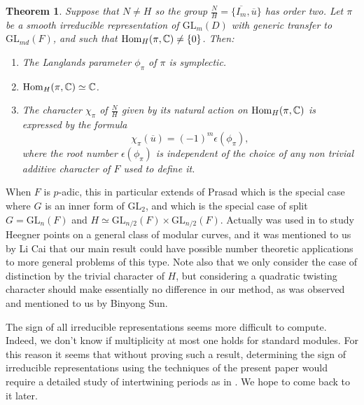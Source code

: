 \documentclass[11pt,letterpaper]{amsart}
\newcommand{\GL}{{\mathrm {GL}}} \newcommand{\PGL}{{\mathrm {PGL}}}
\newcommand{\Hom}{\mathrm{Hom}}
\def\e{\epsilon}
\theoremstyle{plain}
\newtheorem{thm}{Theorem}[section] \newtheorem{cor}[thm]{Corollary}
\numberwithin{equation}{section}
\begin{document}
\begin{thm}\label{thm main}
Suppose that $N\neq H$ so the group $\frac{N}{H}=\{\overline{I_m},\overline{u}\}$ has order two. Let $\pi$ be a smooth irreducible representation of $\GL_{m}(D)$ with generic transfer to $\GL_{md}(F)$, and such that $\Hom_H(\pi,\BC)\neq \{0\}$. Then:
\begin{enumerate}
\item The Langlands parameter $\phi_\pi$ of $\pi$ is symplectic.
\item $\Hom_H(\pi,\BC)\simeq \BC$.
\item The character $\chi_{\pi}$ of $\frac{N}{H}$ given by its natural action on $\Hom_H(\pi,\BC)$ is expressed by the formula \[\chi_\pi(\overline{u})=(-1)^m\e(\phi_\pi),\] where the root number $\e(\phi_\pi)$ is independent of the choice of any non trivial additive character of $F$ used to define it.
\end{enumerate}
\end{thm}


When $F$ is $p$-adic, this in particular extends \cite[Theorem 4]{P} of Prasad which is the special case where $G$ is an inner form of $\GL_2$, and \cite[Theorem 3.2]{LM} which is the special case of split $G=\GL_n(F)$ and $H\simeq \GL_{n/2}(F)\times \GL_{n/2}(F)$. Actually \cite[Theorem 4]{P} was used in \cite{CCL} to study Heegner points on a general class of modular curves, and it was mentioned to us by Li Cai that our main result could have possible number theoretic applications to more general problems of this type. Note also that we only consider the case of distinction by the trivial character of $H$, but considering a quadratic twisting character should make essentially no difference in our method, as was observed and mentioned to us by Binyong Sun. 

The sign of all irreducible representations seems more difficult to compute. Indeed, we don't know if multiplicity at most one holds for standard modules. For this reason it seems that without proving such a result, determining the sign of irreducible representations using the techniques of the present paper would require a detailed study of intertwining periods as in \cite{MatJFA}. We hope to come back to it later. 
\end{document}
